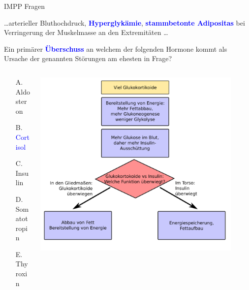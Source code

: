 \documentclass{beamer}
\begin{document}
\begin{frame}{IMPP Fragen}

\dots arterieller Bluthochdruck, \textcolor{blue}{\textbf{Hyperglykämie}}, \textcolor{blue}{\textbf{stammbetonte Adipositas}} bei Verringerung der Muskelmasse an den Extremitäten \dots

Ein primärer \textcolor{blue}{\textbf{Überschuss}} an welchem der folgenden Hormone kommt als Ursache der genannten Störungen am ehesten in Frage? \\[0.2 cm]


\begin{columns}[t]
\begin{column}{3cm}
\begin{itemize}
\item[A.] Aldosteron
\item[B.] \textcolor{blue}{Cortisol} %
\item[C.] Insulin
\item[D.] Somatotropin
\item[E.] Thyroxin

\end{itemize}

\end{column}


\begin{column}{7cm}

\includegraphics[width=0.9\textwidth]{glukokortikoid_ueberschuss.png}

\end{column}


\end{columns}
    
\end{frame}
\end{document}
